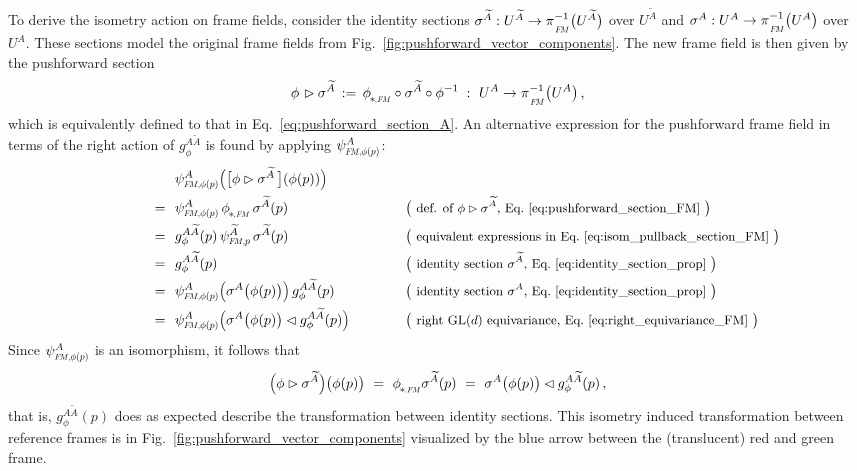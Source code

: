 To derive the isometry action on frame fields, consider the identity sections $\sigma^{\widetilde{A}}: U^{\widetilde{A}} \to \piFM^{-1}\big(U^{\widetilde{A}}\big)$ over $U^{\widetilde{A}}$ and $\sigma^A: U^A \to \piFM^{-1}\big(U^A\big)$ over $U^A$.
These sections model the original frame fields from Fig.~\ref{fig:pushforward_vector_components}.
The new frame field is then given by the pushforward section
\begin{align}\label{eq:pushforward_section_FM}
    \phi \mkern2mu\rhd \sigma^{\widetilde{A}} \,:=\, \dphiFM \circ \sigma^{\widetilde{A}} \circ \phiinv
    \ :\ U^A \to \piFM^{-1}\big( U^A\big) \,,
\end{align}
which is equivalently defined to that in Eq.~\ref{eq:pushforward_section_A}.
An alternative expression for the pushforward frame field in terms of the right action of $g_\phi^{A\widetilde{A}}$ is found by applying $\psiFMphip^A$:
\begin{alignat}{3}
    \qquad\qquad\qquad
     &\ \ \psiFMphip^A \pig(\big[ \phi \rhd \sigma^{\widetilde{A}} \,\big] (\phi(p)) \pig) \notag \\
    =&\ \ \psiFMphip^A \, \dphiFM \, \sigma^{\widetilde{A}}(p)
        \qquad\quad && \big( \text{\small def. of $\phi \rhd \sigma^{\widetilde{A}}$, Eq.~\eqref{eq:pushforward_section_FM} } \big) \notag \\
    =&\ \ g_\phi^{A\widetilde{A}}(p) \, \psiFMp^{\widetilde{A}} \, \sigma^{\widetilde{A}}(p) 
        \qquad\quad && \big( \text{\small equivalent expressions in Eq.~\eqref{eq:isom_pullback_section_FM} } \big) \notag \\
    =&\ \ g_\phi^{A\widetilde{A}}(p)
        \qquad\quad && \big( \text{\small identity section $\sigma^{\widetilde{A}}$, Eq.~\eqref{eq:identity_section_prop} } \big) \notag \\
    =&\ \ \psiFMphip^A \pig( \sigma^A \big(\phi(p)\big) \pig) \, g_\phi^{A\widetilde{A}}(p)
        \qquad\quad && \big( \text{\small identity section $\sigma^A$, Eq.~\eqref{eq:identity_section_prop} } \big) \notag \\
    =&\ \ \psiFMphip^A \pig( \sigma^A \big(\phi(p)\big) \lhd g_\phi^{A\widetilde{A}}(p) \pig)
        \qquad\quad && \big( \text{\small right $\GL{d}$ equivariance, Eq.~\eqref{eq:right_equivariance_FM} } \big)
\end{alignat}
Since $\psiFMphip^A$ is an isomorphism, it follows that
\begin{align}\label{eq:pushfwd_section_right_action}
    \pig(\phi \rhd \sigma^{\widetilde{A}} \pig) \big( \phi(p) \big)
    \ =\ \dphiFM \sigma^{\widetilde{A}} (p)
    \ =\ \sigma^A \big(\phi(p)\big) \lhd g_\phi^{A\widetilde{A}}(p) \,,
\end{align}
that is, $g_\phi^{A\widetilde{A}}(p)$ does as expected describe the transformation between identity sections.
This isometry induced transformation between reference frames is in Fig.~\ref{fig:pushforward_vector_components} visualized by the blue arrow between the (translucent) red and green frame.


